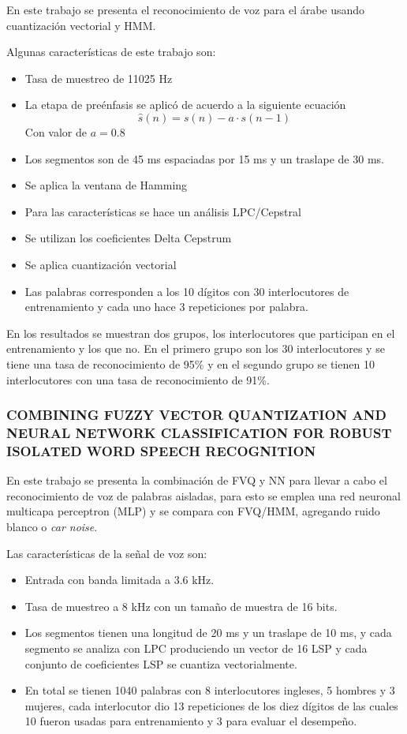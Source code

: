 	En este trabajo se presenta el reconocimiento de voz para el árabe usando cuantización vectorial y HMM.
	
	Algunas características de este trabajo son:
	
	\begin{itemize}
	\item	Tasa de muestreo de 11025 Hz
	\item	La etapa de preénfasis se aplicó de acuerdo a la siguiente ecuación
		\begin{equation}\label{eq:xxx}
			\hat{s}(n)=s(n)-a\cdot s(n-1)
		\end{equation}
		Con valor de $a=0.8$
	\item	Los segmentos son de 45 ms espaciadas por 15 ms y un traslape de 30 ms.
	\item	Se aplica la ventana de Hamming
	\item	Para las características se hace un análisis LPC/Cepstral
	\item	Se utilizan los coeficientes Delta Cepstrum
	\item	Se aplica cuantización vectorial
	\item	Las palabras corresponden a los 10 dígitos con 30 interlocutores de entrenamiento y cada uno hace 3 repeticiones por palabra.
	\end{itemize}
	
	En los resultados se muestran dos grupos, los interlocutores que participan en el entrenamiento y los que no. En el primero grupo son los 30 interlocutores y se tiene una tasa de reconocimiento de 95\% y en el segundo grupo se tienen 10 interlocutores con una tasa de reconocimiento de 91\%.
	
	\subsubsection*{COMBINING FUZZY VECTOR QUANTIZATION AND NEURAL NETWORK CLASSIFICATION FOR ROBUST ISOLATED WORD SPEECH RECOGNITION \cite{A7}}\label{sub:sota:A7}
	
	En este trabajo se presenta la combinación de FVQ y NN para llevar a cabo el reconocimiento de voz de palabras aisladas, para esto se emplea una red neuronal multicapa perceptron (MLP) y se compara con FVQ/HMM, agregando ruido blanco o \textit{car noise}.
	
	Las características de la señal de voz son:
	
	\begin{itemize}
	\item	Entrada con banda limitada a 3.6 kHz.
	\item	Tasa de muestreo a 8 kHz con un tamaño de muestra de 16 bits.
	\item	Los segmentos tienen una longitud de 20 ms y un traslape de 10 ms, y cada segmento se analiza con LPC produciendo un vector de 16 LSP y cada conjunto de coeficientes LSP se cuantiza vectorialmente.
	\item	En total se tienen 1040 palabras con 8 interlocutores ingleses, 5 hombres y 3 mujeres, cada interlocutor dio 13 repeticiones de los diez dígitos de las cuales 10 fueron usadas para entrenamiento y 3 para evaluar el desempeño.
	\end{itemize}
	
